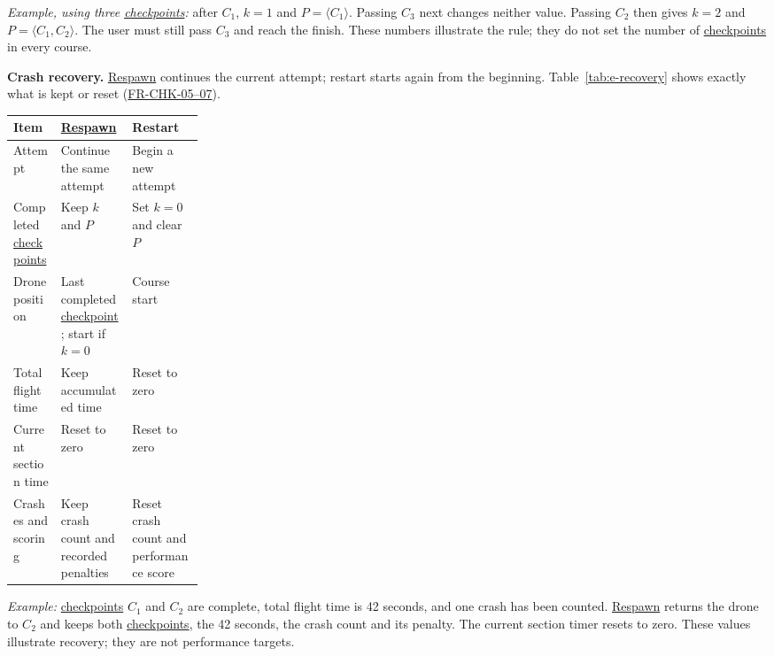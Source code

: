 \documentclass[12pt]{article}
\begin{document}
\begin{description}
\textit{Example, using three \hyperlink{glos:Checkpoint}{checkpoints}:} after $C_1$, $k=1$ and
$P=\langle C_1\rangle$. Passing $C_3$ next changes neither value. Passing $C_2$
then gives $k=2$ and $P=\langle C_1,C_2\rangle$. The user must still pass $C_3$
and reach the finish. These numbers illustrate the rule; they do not set the
number of \hyperlink{glos:Checkpoint}{checkpoints} in every course.

\par\noindent\begin{minipage}{\linewidth}
\textbf{Crash recovery.} \hyperlink{glos:Respawn}{Respawn} continues the current attempt; restart starts
again from the beginning. Table~\ref{tab:e-recovery} shows exactly what is kept
or reset (\hyperref[sec:s2-checkpoints]{FR-CHK-05--07}).

\small\captionsetup{hypcap=false}
\label{tab:e-recovery}
\begin{tabularx}{\linewidth}{@{}p{0.25\linewidth}YY@{}}\toprule
\textbf{Item} & \textbf{\hyperlink{glos:Respawn}{Respawn}} & \textbf{Restart}\\\midrule
Attempt & Continue the same attempt & Begin a new attempt\\
Completed \hyperlink{glos:Checkpoint}{checkpoints} & Keep $k$ and $P$ & Set $k=0$ and clear $P$\\
Drone position & Last completed \hyperlink{glos:Checkpoint}{checkpoint}; start if $k=0$ & Course start\\
Total flight time & Keep accumulated time & Reset to zero\\
Current section time & Reset to zero & Reset to zero\\
Crashes and scoring & Keep crash count and recorded penalties & Reset crash
count and performance score\\\bottomrule
\end{tabularx}
\end{minipage}

\textit{Example:} \hyperlink{glos:Checkpoint}{checkpoints} $C_1$ and $C_2$ are complete, total flight time is
42 seconds, and one crash has been counted. \hyperlink{glos:Respawn}{Respawn} returns the drone to $C_2$
and keeps both \hyperlink{glos:Checkpoint}{checkpoints}, the 42 seconds, the crash count and its penalty.
The current section timer resets to zero. These values illustrate recovery;
they are not performance targets.


\end{description}
\end{document}
